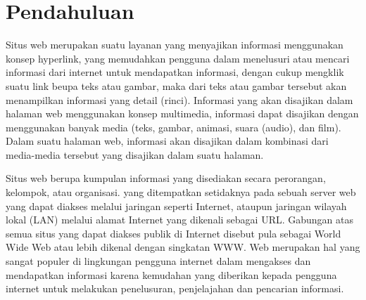 \section{Pendahuluan}
	Situs web merupakan suatu layanan yang menyajikan informasi menggunakan konsep hyperlink, yang memudahkan pengguna dalam menelusuri atau mencari informasi dari internet untuk mendapatkan informasi, dengan cukup mengklik suatu link beupa teks atau gambar, maka dari teks atau gambar tersebut akan menampilkan informasi yang detail (rinci).
Informasi yang akan disajikan dalam halaman web menggunakan konsep multimedia, informasi dapat disajikan dengan menggunakan banyak media (teks, gambar, animasi, suara (audio), dan film). Dalam suatu halaman web, informasi akan disajikan dalam kombinasi dari media-media tersebut yang disajikan dalam suatu halaman.

	Situs web berupa kumpulan informasi yang disediakan secara perorangan, kelompok, atau organisasi. yang ditempatkan setidaknya pada sebuah server web yang dapat diakses melalui jaringan seperti Internet, ataupun jaringan wilayah lokal (LAN) melalui alamat Internet yang dikenali sebagai URL. Gabungan atas semua situs yang dapat diakses publik di Internet disebut pula sebagai World Wide Web atau lebih dikenal dengan singkatan WWW. Web merupakan hal yang sangat populer di lingkungan pengguna internet dalam mengakses dan mendapatkan informasi karena kemudahan yang diberikan kepada pengguna internet untuk melakukan penelusuran, penjelajahan dan pencarian informasi. 

